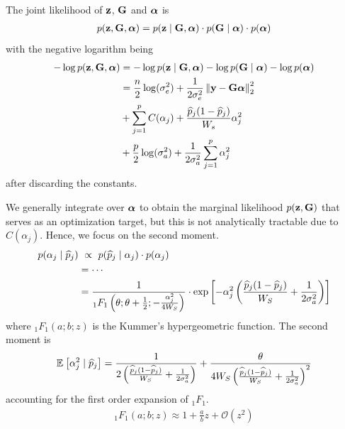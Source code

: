 \documentclass[10pt]{article}
\begin{document}
The joint likelihood of ${\mathbf{z}}$, $\mathbf{G}$ and $\boldsymbol{\alpha}$ is
\begin{align} \label{eq:joint_like_fitness}
    \begin{aligned}
        p({\mathbf{z}}, \mathbf{G}, \boldsymbol{\alpha}) &= p({\mathbf{z}} \mid \mathbf{G}, \boldsymbol{\alpha})
        \cdot p(\mathbf{G} \mid \boldsymbol{\alpha}) 
        \cdot p(\boldsymbol{\alpha}) \\
    \end{aligned}
\end{align}
with the negative logarithm being
\begin{align}
    \begin{aligned}
        - \log p ({\mathbf{z}}, \mathbf{G}, \boldsymbol{\alpha})
        &= - \log p({\mathbf{z}} \mid \mathbf{G}, \boldsymbol{\alpha}) - \log p(\mathbf{G} \mid \boldsymbol{\alpha}) - \log p (\boldsymbol{\alpha}) \\
        &= \frac{n}{2}\log(\sigma_e^2) + \frac{1}{2\sigma_e^2}\left\| \mathbf{y} - \mathbf{G} \boldsymbol{\alpha} \right\|_2^2 \\
        &+ \sum_{j=1}^pC(\alpha_j) + \frac{\widehat{p}_j(1-\widehat{p}_j)}{W_s} \alpha_j^2 \\
        &+ \frac{p}{2}\log(\sigma_a^2) + \frac{1}{2\sigma_a^2}\sum_{j=1}^p \alpha_j^2
    \end{aligned}
\end{align}
after discarding the constants.

We generally integrate over $\boldsymbol{\alpha}$ to obtain the marginal likelihood $p({\mathbf{z}}, \mathbf{G})$ that serves as an optimization target,
but this is not analytically tractable due to $C(\alpha_j)$.
Hence, we focus on the second moment.
\begin{align}
    \begin{aligned}
        p(\alpha_j \mid \widehat{p}_j) 
        &\ \propto \ p(\widehat{p}_j \mid \alpha_j) \cdot p(\alpha_j) \\
        &= \cdots \\
        &= \frac{1}{ _1F_1\left(\theta; \theta+\frac{1}{2};-\frac{\alpha_j^2}{4W_S}\right)} 
        \cdot 
        \exp\left[
        -\alpha_j^2\left(
        \frac{\widehat{p}_j(1-\widehat{p}_j)}{W_S}
         + \frac{1}{2\sigma_a^2}
        \right)
        \right]
    \end{aligned} 
\end{align}
where $_1F_1(a;b;z)$ is the Kummer's hypergeometric function.
The second moment is 
\begin{align}
    \mathbb{E}_{}\left[\alpha_j^2 \mid \widehat{p}_j\right] =
    \frac{1}{2\left( \frac{\widehat{p}_j(1-\widehat{p}_j)}{W_S} + \frac{1}{2\sigma_a^2} \right)} 
    + \frac{\theta}{4W_S \left( \frac{\widehat{p}_j(1-\widehat{p}_j)}{W_S} + \frac{1}{2\sigma_a^2} \right)^2}
\end{align}
accounting for the first order expansion of $_1F_1$.
\begin{align}
    _1 F_1(a;b;z) \approx 1 + \frac{a}{b}z + \mathcal{O}(z^2)
\end{align}
\end{document}
